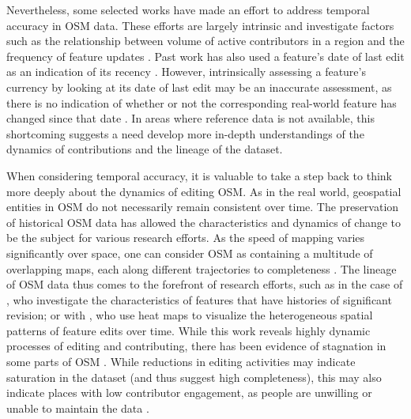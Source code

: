 Nevertheless, some selected works have made an effort to address temporal accuracy in OSM data. These efforts are largely intrinsic and investigate factors such as the relationship between volume of active contributors in a region and the frequency of feature updates \parencite{girres_quality_2010}. Past work has also used a feature's date of last edit as an indication of its recency \parencite{minghini_open_2018, roick_technical_2012}. However, intrinsically assessing a feature’s currency by looking at its date of last edit may be an inaccurate assessment, as there is no indication of whether or not the corresponding real-world feature has changed since that date \parencite{barron_comprehensive_2014}. In areas where reference data is not available, this shortcoming suggests a need develop more in-depth understandings of the dynamics of contributions and the lineage of the dataset. 

When considering temporal accuracy, it is valuable to take a step back to think more deeply about the dynamics of editing OSM. As in the real world, geospatial entities in OSM do not necessarily remain consistent over time. The preservation of historical OSM data has allowed the characteristics and dynamics of change to be the subject for various research efforts. As the speed of mapping varies significantly over space, one can consider OSM as containing a multitude of overlapping maps, each along different trajectories to completeness \parencite{chuang_one_2013}. The lineage of OSM data thus comes to the forefront of research efforts, such as in the case of \textcite{mooney_characteristics_2012}, who investigate the characteristics of features that have histories of significant revision; or with  \textcite{trame_exploring_2011}, who use heat maps to visualize the heterogeneous spatial patterns of feature edits over time. While this work reveals highly dynamic processes of editing and contributing, there has been evidence of stagnation in some parts of OSM \parencite{grochenig_digging_2014}. While reductions in editing activities may indicate saturation in the dataset (and thus suggest high completeness), this may also indicate places with low contributor engagement, as people are unwilling or unable to maintain the data \parencite{grochenig_digging_2014}.

